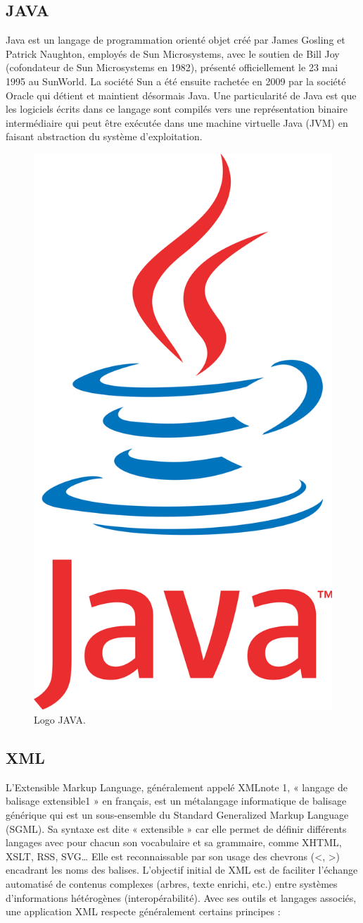 \documentclass[12pt,a4paper]{report}
\begin{document}
\subsection{JAVA}
Java est un langage de programmation orienté objet créé par James Gosling et Patrick Naughton, employés de Sun Microsystems, avec le soutien de Bill Joy (cofondateur de Sun Microsystems en 1982), présenté officiellement le 23 mai 1995 au SunWorld.
La société Sun a été ensuite rachetée en 2009 par la société Oracle qui détient et maintient désormais Java.
Une particularité de Java est que les logiciels écrits dans ce langage sont compilés vers une représentation binaire intermédiaire qui peut être exécutée dans une machine virtuelle Java (JVM) en faisant abstraction du système d'exploitation.
\begin{figure}[H]
	\centering
	\includegraphics[width=0.3\linewidth]{java}
	\caption{Logo JAVA.}
	
\end{figure}

\subsection{XML}
L'Extensible Markup Language, généralement appelé XMLnote 1, « langage de balisage extensible1 » en français, est un métalangage informatique de balisage générique qui est un sous-ensemble du Standard Generalized Markup Language (SGML). Sa syntaxe est dite « extensible » car elle permet de définir différents langages avec pour chacun son vocabulaire et sa grammaire, comme XHTML, XSLT, RSS, SVG… Elle est reconnaissable par son usage des chevrons (<, >) encadrant les noms des balises. L'objectif initial de XML est de faciliter l'échange automatisé de contenus complexes (arbres, texte enrichi, etc.) entre systèmes d'informations hétérogènes (interopérabilité). Avec ses outils et langages associés, une application XML respecte généralement certains principes :
\end{document}
